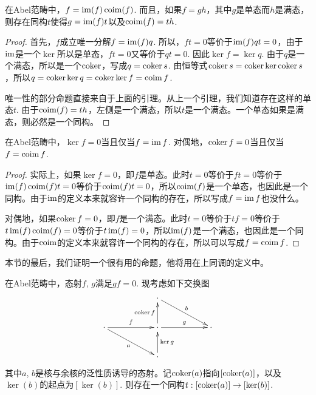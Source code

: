 \begin{pro}\label{uni}
在Abel范畴中，$f=\operatorname{im}(f)\operatorname{coim}(f)$. 而且，如果$f=gh$，其中$g$是单态而$h$是满态，则存在同构$t$使得$g=\operatorname{im}(f)t$以及$\operatorname{coim}(f)=th$.
\end{pro}

\begin{proof}
首先，$f$成立唯一分解$f=\operatorname{im}(f)q$. 所以，$ft=0$等价于$\operatorname{im}(f)qt=0$，由于$\operatorname{im}$是一个$\ker$所以是单态，$ft=0$又等价于$qt=0$. 因此$\ker f= \ker q$. 由于$q$是一个满态，所以是一个$\operatorname{coker}$，写成$q=\operatorname{coker} s$. 由恒等式$\operatorname{coker} s = \operatorname{coker} \ker \operatorname{coker} s$，所以$q=\operatorname{coker} \ker q=\operatorname{coker} \ker f=\operatorname{coim} f$. 

唯一性的部分命题直接来自于上面的引理。从上一个引理，我们知道存在这样的单态$t$. 由于$\operatorname{coim}(f)=th$，左侧是一个满态，所以$t$是一个满态。一个单态如果是满态，则必然是一个同构。
\end{proof}

\begin{pro}
在Abel范畴中，$\ker f=0$当且仅当$f=\operatorname{im} f$. 对偶地，$\operatorname{coker} f=0$当且仅当$f=\operatorname{coim} f$. 
\end{pro}

\begin{proof}
实际上，如果$\ker f=0$，即$f$是单态。此时$t=0$等价于$ft=0$等价于$\operatorname{im} (f) \operatorname{coim}(f)t=0$等价于$\operatorname{coim}(f)t=0$，所以$\operatorname{coim}(f)$是一个单态，也因此是一个同构。由于$\operatorname{im}$的定义本来就容许一个同构的存在，所以写成$f=\operatorname{im} f$也没什么。

对偶地，如果$\operatorname{coker} f=0$，即$f$是一个满态。此时$t=0$等价于$tf=0$等价于$t\operatorname{im} (f) \operatorname{coim}(f)=0$等价于$t\operatorname{im}(f)=0$，所以$\operatorname{im}(f)$是一个满态，也因此是一个同构。由于$\operatorname{coim}$的定义本来就容许一个同构的存在，所以可以写成$f=\operatorname{coim} f$.
\end{proof}

本节的最后，我们证明一个很有用的命题，他将用在上同调的定义中。

\begin{pro}
在Abel范畴中，态射$f$, $g$满足$gf=0$. 现考虑如下交换图
\[
\begin{xy}
	\xymatrix{
	&&\cdot \ar[rrd]^b&&\\
	\cdot \ar[rr]^f \ar[rrd]_a&&\cdot \ar[rr]^g\ar[u]^{\coker f}&&\cdot\\
	&&\cdot \ar[u]_{\ker g}&&
	}
\end{xy}
\]
其中$a$, $b$是核与余核的泛性质诱导的态射。记$\operatorname{coker}(a)$指向$[\operatorname{coker}(a)]$，以及$\ker(b)$的起点为$[\ker(b)]$. 则存在一个同构$t:[\operatorname{coker}(a)]\to [\ker(b)]$.
\end{pro}

